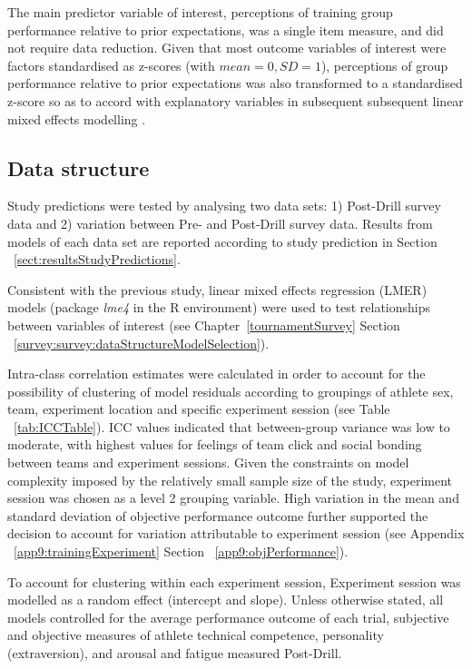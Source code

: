 The main predictor variable of interest, perceptions of training group performance relative to prior expectations, was a single item measure, and did not require data reduction.  Given that most outcome variables of interest were factors standardised as z-scores (with $mean = 0, SD = 1$), perceptions of group performance relative to prior expectations was also transformed to a standardised z-score so as to accord with explanatory variables in subsequent subsequent linear mixed effects modelling \citep[for an explanation, see, for example, ][1058]{Beckmann2003}.


\subsection{Data structure}

Study predictions were tested by analysing two data sets:  1) Post-Drill survey data and 2) variation between Pre- and Post-Drill survey data.  Results from models of each data set are reported according to study prediction in Section ~\ref{sect:resultsStudyPredictions}.

Consistent with the previous study, linear mixed effects regression (LMER) models (package \textit{lme4} in the R environment) were used to test relationships between variables of interest (see Chapter~\ref{tournamentSurvey} Section ~\ref{survey:survey:dataStructureModelSelection}).


Intra-class correlation estimates were calculated in order to account for the possibility of clustering of model residuals according to groupings of athlete sex, team, experiment location and specific experiment session (see Table ~\ref{tab:ICCTable}).  ICC values indicated that between-group variance was low to moderate, with highest values for feelings of team click and social bonding between teams and experiment sessions. Given the constraints on model complexity imposed by the relatively small sample size of the study, experiment session was chosen as a level 2 grouping variable.  High variation in the mean and standard deviation of objective performance outcome further supported the decision to account for variation attributable to experiment session (see Appendix ~\ref{app9:trainingExperiment} Section ~\ref{app9:objPerformance}).

To account for clustering within each experiment session, Experiment session was modelled as a random effect (intercept and slope).  Unless otherwise stated, all models controlled for the average performance outcome of each trial, subjective and objective measures of athlete technical competence, personality (extraversion), and arousal and fatigue measured Post-Drill.


